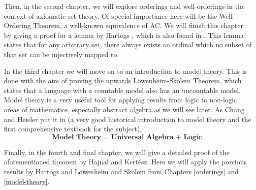 \documentclass[../../main.tex]{subfiles}
\begin{document}
Then, in the second chapter, we will explore orderings and well-orderings in the context of axiomatic set theory.
Of special importance here will be the Well-Ordering Theorem, a well-known equivalence of AC.
We will finish this chapter by giving a proof for a lemma by Hartogs \cite{Har15}, which is also found in \cite{Haj72}.
This lemma states that for any arbitrary set, there always exists an ordinal which no subset of that set can be injectively mapped to.

In the third chapter we will move on to an introduction to model theory. 
This is done with the aim of proving the upwards Löwenheim-Skolem Theorem, which states that a language with a countable model also has an uncountable model.
Model theory is a very useful tool for applying results from logic to non-logic areas of mathematics, especially abstract algebra as we will see later.
As Chang and Heisler put it in \cite{Cha90} (a very good historical introduction to model theory and the first comprehensive textbook for the subject), 
$$\textbf{Model Theory = Universal Algebra + Logic}.$$

Finally, in the fourth and final chapter, we will give a detailed proof of the aforementioned theorem by Hajnal and Kertész.
Here we will apply the previous results by Hartogs and Löwenheim and Skolem from Chapters \ref{orderings} and \ref{model-theory}.
\end{document}
